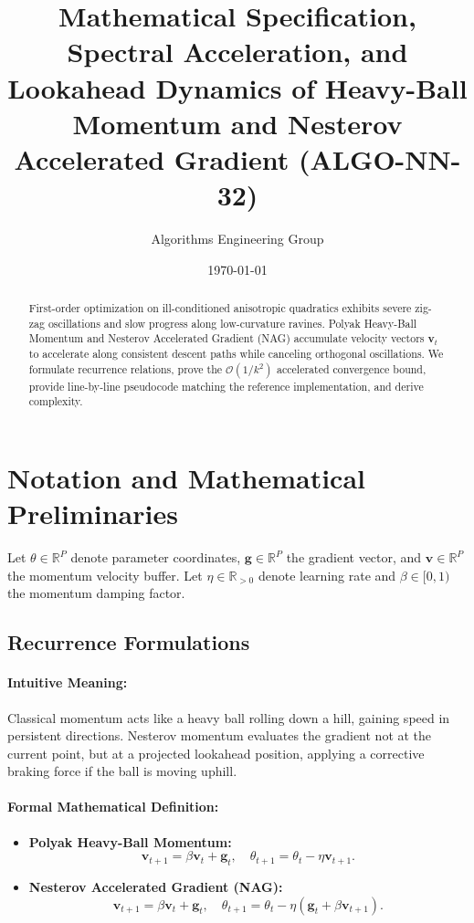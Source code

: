 \documentclass[11pt]{article}
\title{\textbf{Mathematical Specification, Spectral Acceleration, and Lookahead Dynamics of Heavy-Ball Momentum and Nesterov Accelerated Gradient (ALGO-NN-32)}}
\author{Algorithms Engineering Group}
\date{\today}
\begin{document}
\maketitle

\begin{abstract}
First-order optimization on ill-conditioned anisotropic quadratics exhibits severe zig-zag oscillations and slow progress along low-curvature ravines. Polyak Heavy-Ball Momentum and Nesterov Accelerated Gradient (NAG) accumulate velocity vectors $\mathbf{v}_t$ to accelerate along consistent descent paths while canceling orthogonal oscillations. We formulate recurrence relations, prove the $\mathcal{O}(1/k^2)$ accelerated convergence bound, provide line-by-line pseudocode matching the reference implementation, and derive complexity.
\end{abstract}

\section{Notation and Mathematical Preliminaries}
\label{sec:notation}

Let $\theta \in \mathbb{R}^P$ denote parameter coordinates, $\mathbf{g} \in \mathbb{R}^P$ the gradient vector, and $\mathbf{v} \in \mathbb{R}^P$ the momentum velocity buffer. Let $\eta \in \mathbb{R}_{>0}$ denote learning rate and $\beta \in [0, 1)$ the momentum damping factor.

\subsection{Recurrence Formulations}
\paragraph{Intuitive Meaning:} Classical momentum acts like a heavy ball rolling down a hill, gaining speed in persistent directions. Nesterov momentum evaluates the gradient not at the current point, but at a projected lookahead position, applying a corrective braking force if the ball is moving uphill.

\paragraph{Formal Mathematical Definition:}
\begin{itemize}
    \item \textbf{Polyak Heavy-Ball Momentum:}
    \begin{equation}
    \label{eq:polyak_momentum}
    \mathbf{v}_{t+1} = \beta \mathbf{v}_t + \mathbf{g}_t, \quad \theta_{t+1} = \theta_t - \eta \mathbf{v}_{t+1}.
    \end{equation}
    \item \textbf{Nesterov Accelerated Gradient (NAG):}
    \begin{equation}
    \label{eq:nesterov_momentum}
    \mathbf{v}_{t+1} = \beta \mathbf{v}_t + \mathbf{g}_t, \quad \theta_{t+1} = \theta_t - \eta (\mathbf{g}_t + \beta \mathbf{v}_{t+1}).
    \end{equation}
\end{itemize}
\end{document}
